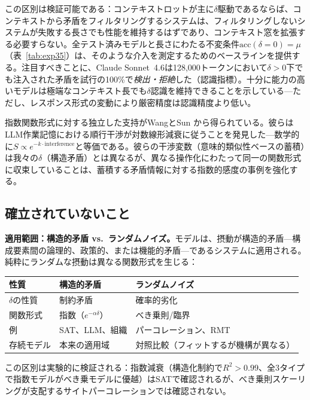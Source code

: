 \documentclass[11pt,a4paper]{article}
\begin{document}
\noindent この区別は検証可能である：コンテキストロットが主に$\delta$駆動であるならば、コンテキストから矛盾をフィルタリングするシステムは、フィルタリングしないシステムが失敗する長さでも性能を維持するはずであり、コンテキスト窓を拡張する必要すらない。全テスト済みモデルと長さにわたる不変条件$\text{acc}(\delta = 0) = \mu$（表~\ref{tab:exp35}）は、そのような介入を測定するためのベースラインを提供する。注目すべきことに、Claude Sonnet~4.6は128{,}000トークンにおいて$\delta > 0$下でも注入された矛盾を試行の100\%で\emph{検出・拒絶}した（認識指標）。十分に能力の高いモデルは極端なコンテキスト長でも$\delta$認識を維持できることを示している---ただし、レスポンス形式の変動により厳密精度は認識精度より低い。

指数関数形式に対する独立した支持がWangとSun \cite{wang2025interference}から得られている。彼らはLLM作業記憶における順行干渉が対数線形減衰に従うことを発見した---数学的に$S \propto e^{-k \cdot \text{interference}}$と等価である。彼らの干渉変数（意味的類似性ベースの蓄積）は我々の$\delta$（構造矛盾）とは異なるが、異なる操作化にわたって同一の関数形式に収束していることは、蓄積する矛盾情報に対する指数的感度の事例を強化する。

\subsection{確立されていないこと}

\textbf{適用範囲：構造的矛盾 vs.\ ランダムノイズ。}モデルは、摂動が構造的矛盾---構成要素間の論理的、政策的、または機能的矛盾---であるシステムに適用される。純粋にランダムな摂動は異なる関数形式を生じる：

\begin{center}
\small
\begin{tabular}{lll}
\toprule
\textbf{性質} & \textbf{構造的矛盾} & \textbf{ランダムノイズ} \\
\midrule
$\delta$の性質 & 制約矛盾 & 確率的劣化 \\
関数形式 & 指数（$e^{-\alpha\delta}$） & べき乗則/臨界 \\
例 & SAT、LLM、組織 & パーコレーション、RMT \\
存続モデル & 本来の適用域 & 対照比較（フィットするが機構が異なる） \\
\bottomrule
\end{tabular}
\end{center}

この区別は実験的に検証される：指数減衰（構造化制約で$R^2 > 0.99$、全3タイプで指数モデルがべき乗モデルに優越）はSATで確認されるが、べき乗則スケーリングが支配するサイトパーコレーションでは確認されない。
\end{document}
